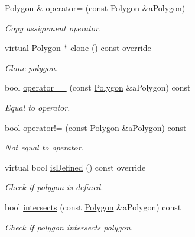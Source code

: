 \begin{DoxyCompactItemize}
\hyperlink{classlibrary_1_1math_1_1geom_1_1d2_1_1objects_1_1_polygon}{Polygon} \& \hyperlink{classlibrary_1_1math_1_1geom_1_1d2_1_1objects_1_1_polygon_afd72b5c2aa958835958d197ee57c3152}{operator=} (const \hyperlink{classlibrary_1_1math_1_1geom_1_1d2_1_1objects_1_1_polygon}{Polygon} \&a\+Polygon)
\begin{DoxyCompactList}\small\item\em Copy assignment operator. \end{DoxyCompactList}\item 
virtual \hyperlink{classlibrary_1_1math_1_1geom_1_1d2_1_1objects_1_1_polygon}{Polygon} $\ast$ \hyperlink{classlibrary_1_1math_1_1geom_1_1d2_1_1objects_1_1_polygon_a15bbbe7e468a50d6059e2df946175e1c}{clone} () const override
\begin{DoxyCompactList}\small\item\em Clone polygon. \end{DoxyCompactList}\item 
bool \hyperlink{classlibrary_1_1math_1_1geom_1_1d2_1_1objects_1_1_polygon_a2d92051aa3535659ec1ca1849ea65fa0}{operator==} (const \hyperlink{classlibrary_1_1math_1_1geom_1_1d2_1_1objects_1_1_polygon}{Polygon} \&a\+Polygon) const
\begin{DoxyCompactList}\small\item\em Equal to operator. \end{DoxyCompactList}\item 
bool \hyperlink{classlibrary_1_1math_1_1geom_1_1d2_1_1objects_1_1_polygon_a904fe22c8a690a6b5eb4f8746602d637}{operator!=} (const \hyperlink{classlibrary_1_1math_1_1geom_1_1d2_1_1objects_1_1_polygon}{Polygon} \&a\+Polygon) const
\begin{DoxyCompactList}\small\item\em Not equal to operator. \end{DoxyCompactList}\item 
virtual bool \hyperlink{classlibrary_1_1math_1_1geom_1_1d2_1_1objects_1_1_polygon_a83e0962f91f0732048e156ad634faaea}{is\+Defined} () const override
\begin{DoxyCompactList}\small\item\em Check if polygon is defined. \end{DoxyCompactList}\item 
bool \hyperlink{classlibrary_1_1math_1_1geom_1_1d2_1_1objects_1_1_polygon_a29df028aaa9e1be74ae8ea1716cf99da}{intersects} (const \hyperlink{classlibrary_1_1math_1_1geom_1_1d2_1_1objects_1_1_polygon}{Polygon} \&a\+Polygon) const
\begin{DoxyCompactList}\small\item\em Check if polygon intersects polygon. \end{DoxyCompactList}\item 

\end{DoxyCompactItemize}
